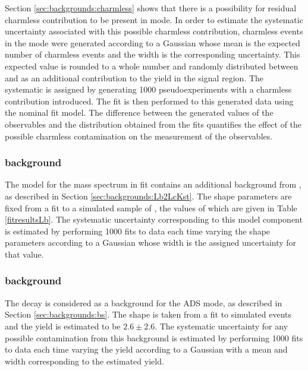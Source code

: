 Section \ref{sec:backgrounds:charmless} shows that there is a possibility for residual charmless contribution to be present in \pipi mode. In order to estimate the systematic uncertainty associated with this possible charmless contribution, charmless events in the \pipi mode were generated according to a Gaussian whose mean is the expected number of charmless events and the width is the corresponding uncertainty. This expected value is rounded to a whole number and randomly distributed between \Bp and \Bm as an additional contribution to the yield in the signal region. The systematic is assigned by generating 1000 pseudoexperiments with a charmless contribution introduced. The fit is then performed to this generated data using the nominal fit model. The difference between the generated values of the \CP observables and the distribution obtained from the fits quantifies the effect of the possible charmless contamination on the measurement of the \CP observables.

\subsubsection{\boldmath {} background}

The model for the \kk mass spectrum in \CP fit contains an additional background from , as described in Section \ref{sec:backgrounds:Lb2LcKst}. The shape parameters are fixed from a fit to a simulated sample of , the values of which are given in Table \ref{fitresultsLb}. The systematic uncertainty corresponding to this model component is estimated by performing 1000 fits to data each time varying the shape parameters according to a Gaussian whose width is the assigned uncertainty for that value.

\subsubsection{\boldmath {} background}

The decay  is considered as a background for the ADS mode, as described in Section \ref{sec:backgrounds:bs}. The shape is taken from a fit to simulated events and the yield is estimated to be $2.6 \pm 2.6$. The systematic uncertainty for any possible contamination from this background is estimated by performing 1000 fits to data each time varying the yield according to a Gaussian with a mean and width corresponding to the estimated yield.

